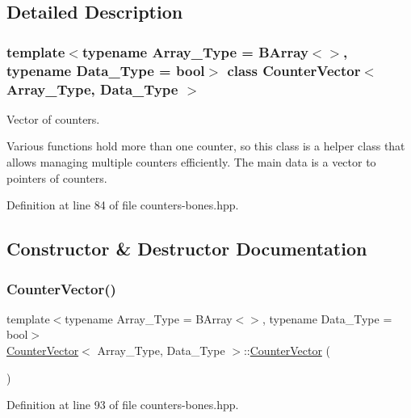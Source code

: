 \subsection{Detailed Description}
\subsubsection*{template$<$typename Array\+\_\+\+Type = B\+Array$<$$>$, typename Data\+\_\+\+Type = bool$>$\newline
class Counter\+Vector$<$ Array\+\_\+\+Type, Data\+\_\+\+Type $>$}

Vector of counters. 

Various functions hold more than one counter, so this class is a helper class that allows managing multiple counters efficiently. The main data is a vector to pointers of counters. 

Definition at line 84 of file counters-\/bones.\+hpp.



\subsection{Constructor \& Destructor Documentation}
\mbox{\label{class_counter_vector_a536074f2ce013785e547a7bc30bc1942}} 
\subsubsection{\texorpdfstring{Counter\+Vector()}{CounterVector()}}
{\footnotesize\ttfamily template$<$typename Array\+\_\+\+Type = B\+Array$<$$>$, typename Data\+\_\+\+Type = bool$>$ \\
\hyperlink{class_counter_vector}{Counter\+Vector}$<$ Array\+\_\+\+Type, Data\+\_\+\+Type $>$\+::\hyperlink{class_counter_vector}{Counter\+Vector} (\begin{DoxyParamCaption}{ }\end{DoxyParamCaption})\hspace{0.3cm}{\ttfamily [inline]}}



Definition at line 93 of file counters-\/bones.\+hpp.

\mbox{\label{class_counter_vector_ac6fc360b2df296630fb2614836dd74af}} 
